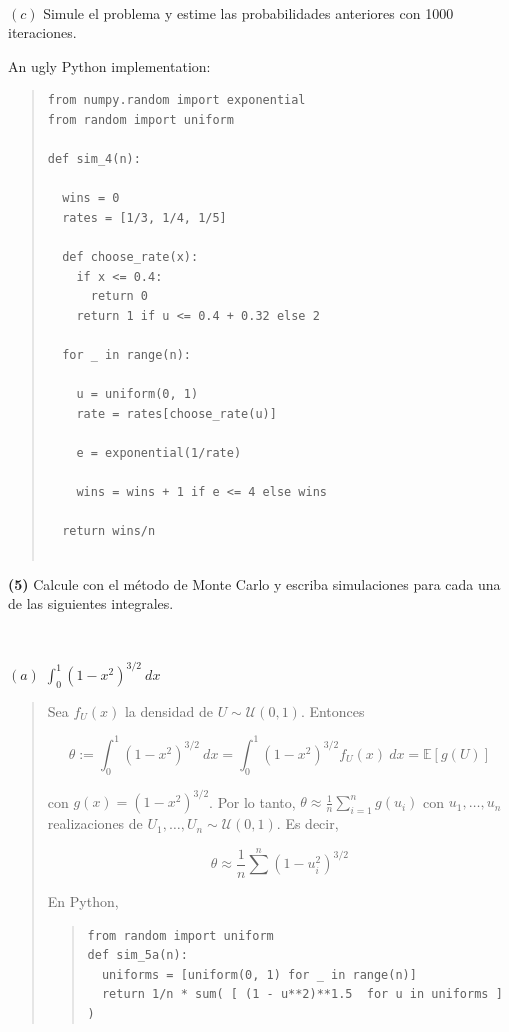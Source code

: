 \documentclass[a4paper, 12pt]{article}
\begin{document}
~

$(c)$ Simule el
problema y estime las probabilidades anteriores con 1000 iteraciones.

An ugly Python implementation:


\small
\begin{quote}

\begin{verbatim}
from numpy.random import exponential
from random import uniform

def sim_4(n):

  wins = 0
  rates = [1/3, 1/4, 1/5]

  def choose_rate(x):
    if x <= 0.4:
      return 0 
    return 1 if u <= 0.4 + 0.32 else 2

  for _ in range(n): 

    u = uniform(0, 1)
    rate = rates[choose_rate(u)]

    e = exponential(1/rate)

    wins = wins + 1 if e <= 4 else wins

  return wins/n 


\end{verbatim}

\end{quote}
\normalsize

\pagebreak 

\textbf{(5)} Calcule con el método de Monte Carlo y escriba simulaciones para
cada una de las siguientes integrales. 

~ 

$(a)$ $\int_0^1 (1-x^2)^{3 / 2} ~ dx$


\small
\begin{quote}

Sea $f_U(x)$ la densidad de $U \sim \mathcal{U}(0, 1)$. Entonces 

\begin{equation*}
  \theta := \int_0^1(1-x^2)^{3 / 2} ~ dx = \int_0^1 (1-x^2)^{3 / 2} f_U(x) ~ dx =
  \mathbb{E}\left[ g(U) \right] 
\end{equation*}

con $g(x) = (1-x^2)^{3 / 2}$. Por lo tanto, $\theta \approx \frac{1}{n}
\sum_{i=1}^n g(u_i)$ con $u_1, \ldots, u_n$ realizaciones de $U_1, \ldots, U_n
\sim \mathcal{U}(0, 1)$. Es decir, 

\begin{equation*}
  \theta \approx \frac{1}{n} \sum^n (1 - u_i^2)^{3 / 2}
\end{equation*}

En Python,

\begin{quote}
\begin{verbatim}
from random import uniform
def sim_5a(n):
  uniforms = [uniform(0, 1) for _ in range(n)]
  return 1/n * sum( [ (1 - u**2)**1.5  for u in uniforms ] )

\end{verbatim}
\end{quote}

\pagebreak

\end{quote}
\normalsize
\end{document}

